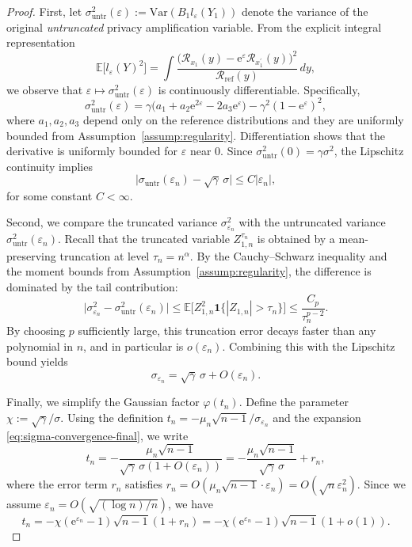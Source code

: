 \documentclass{article}
\theoremstyle{plain}
\theoremstyle{definition}
\begin{document}
\begin{proof}
First, let $\sigma_{\mathrm{untr}}^2(\varepsilon) := \mathrm{Var}(B_1 l_{\varepsilon}(Y_1))$ denote the variance of the original \emph{untruncated} privacy amplification variable. From the explicit integral representation
\[
  \mathbb E\bigl[l_{\varepsilon}(Y)^2\bigr]
  = \int \frac{\bigl(\mathcal R_{x_1}(y) - \mathrm e^{\varepsilon}\mathcal R_{x_1^\prime}(y)\bigr)^2}
              {\mathcal R_{\mathrm{ref}}(y)}\,dy,
\]
we observe that $\varepsilon \mapsto \sigma_{\mathrm{untr}}^2(\varepsilon)$ is continuously differentiable. Specifically,
\[
  \sigma_{\mathrm{untr}}^2(\varepsilon)
  = \gamma\bigl(a_1 + a_2 \mathrm e^{2\varepsilon} - 2 a_3 \mathrm e^{\varepsilon}\bigr)
    - \gamma^2(1-\mathrm e^{\varepsilon})^2,
\]
where $a_1, a_2, a_3$ depend only on the reference distributions and they are uniformly bounded from Assumption~\ref{assump:regularity}.
Differentiation shows that the derivative is uniformly bounded for $\varepsilon$ near $0$.
Since $\sigma_{\mathrm{untr}}^2(0) = \gamma \sigma^2$, the Lipschitz continuity implies
\[
  \bigl|\sigma_{\mathrm{untr}}(\varepsilon_n) - \sqrt{\gamma}\,\sigma\bigr|
  \le C |\varepsilon_n|,
\]
for some constant $C<\infty$.

Second, we compare the truncated variance $\sigma_{\varepsilon_n}^2$ with the untruncated variance $\sigma_{\mathrm{untr}}^2(\varepsilon_n)$.
Recall that the truncated variable $Z_{1,n}^{\tau_n}$ is obtained by a mean-preserving truncation at level $\tau_n = n^\alpha$.
By the Cauchy--Schwarz inequality and the moment bounds from Assumption~\ref{assump:regularity}, the difference is dominated by the tail contribution:
\[
  \bigl|\sigma_{\varepsilon_n}^2 - \sigma_{\mathrm{untr}}^2(\varepsilon_n)\bigr|
  \le \mathbb E\bigl[Z_{1,n}^2 \mathbf 1\{|Z_{1,n}| > \tau_n\}\bigr]
  \le \frac{C_p}{\tau_n^{p-2}}.
\]
By choosing $p$ sufficiently large, this truncation error decays faster than any polynomial in $n$, and in particular is $o(\varepsilon_n)$.
Combining this with the Lipschitz bound yields
\begin{equation}
  \label{eq:sigma-convergence-final}
  \sigma_{\varepsilon_n}
  = \sqrt{\gamma}\,\sigma + O(\varepsilon_n).
\end{equation}


Finally, we simplify the Gaussian factor $\varphi(t_n)$.
Define the parameter $\chi := \sqrt{\gamma}/\sigma$.
Using the definition $t_n = -\mu_n\sqrt{n-1}/\sigma_{\varepsilon_n}$ and the expansion \eqref{eq:sigma-convergence-final}, we write
\[
  t_n
  = -\frac{\mu_n\sqrt{n-1}}{\sqrt{\gamma}\,\sigma(1+O(\varepsilon_n))}
  = -\frac{\mu_n\sqrt{n-1}}{\sqrt{\gamma}\,\sigma} + r_n,
\]
where the error term $r_n$ satisfies
$r_n = O(\mu_n\sqrt{n-1}\cdot \varepsilon_n) = O(\sqrt{n} \varepsilon_n^2)$.
Since we assume $\varepsilon_n = O(\sqrt{(\log n)/n})$, we have 
\[
t_n = -\chi(\mathrm e^{\varepsilon_n}-1)\sqrt{n-1}(1+r_n) = -\chi(\mathrm e^{\varepsilon_n}-1)\sqrt{n-1}(1+o(1)).
\]


\end{proof}
\end{document}
